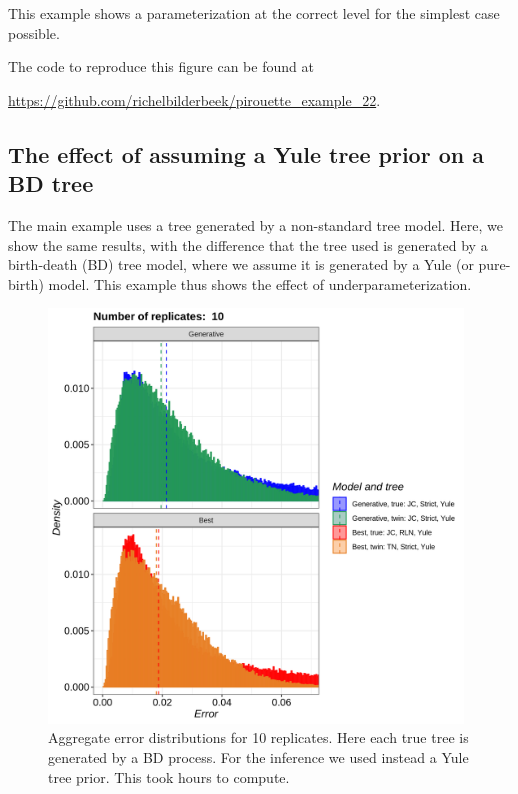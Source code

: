 This example shows a parameterization at the correct level for the
simplest case possible.


The code to reproduce this figure can be found at  
\begin{sloppypar}
  \url{https://github.com/richelbilderbeek/pirouette_example_22}.
\end{sloppypar}

\newpage

\subsection{The effect of assuming a Yule tree prior on a BD tree}
\label{subsec:under_parameterization}

The main example uses a tree generated by a non-standard tree model.
Here, we show the same results, with the difference that
the tree used is generated by a birth-death (BD) tree model,
where we assume it is generated by a Yule (or pure-birth) model.
This example thus shows the effect of underparameterization.

\begin{figure}[H]
  \includegraphics[width=0.98\textwidth]{pirouette_example_26/errors.png}
  \caption{Aggregate error distributions for 10 replicates. 
  Here each true tree is generated by a BD process. 
  For the inference we used instead a Yule tree prior. This took 
   hours to compute.
}
\end{figure}

